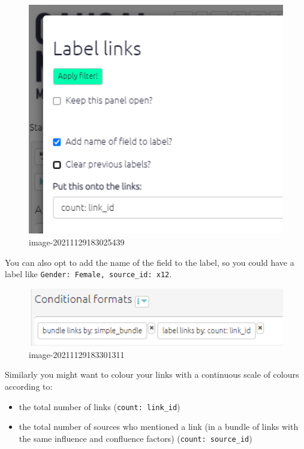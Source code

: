 \documentclass[
]{book}
\providecommand{\tightlist}{%
  \setlength{\itemsep}{0pt}\setlength{\parskip}{0pt}}
\begin{document}
\begin{figure}
\centering
\includegraphics[width=6.77083in,height=\textheight]{_assets/image-20211129183025439.png}
\caption{image-20211129183025439}
\end{figure}

You can also opt to add the name of the field to the label, so you could have a label like \texttt{Gender:\ Female,\ source\_id:\ x12}.

\begin{figure}
\centering
\includegraphics[width=6.77083in,height=\textheight]{_assets/image-20211129183301311.png}
\caption{image-20211129183301311}
\end{figure}

Similarly you might want to colour your links with a continuous scale of colours according to:

\begin{itemize}
\tightlist
\item
  the total number of links (\texttt{count:\ link\_id})
\item
  the total number of sources who mentioned a link (in a bundle of links with the same influence and confluence factors) (\texttt{count:\ source\_id})
\end{itemize}
\end{document}
